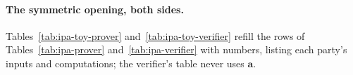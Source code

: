 \documentclass[11pt,a4paper]{article}
\theoremstyle{definition}
\begin{document}
\paragraph{The symmetric opening, both sides.}
Tables~\ref{tab:ipa-toy-prover} and~\ref{tab:ipa-toy-verifier} refill
the rows of Tables~\ref{tab:ipa-prover} and~\ref{tab:ipa-verifier} with
numbers, listing each party's inputs and computations; the verifier's
table never uses $\mathbf a$.
\end{document}
